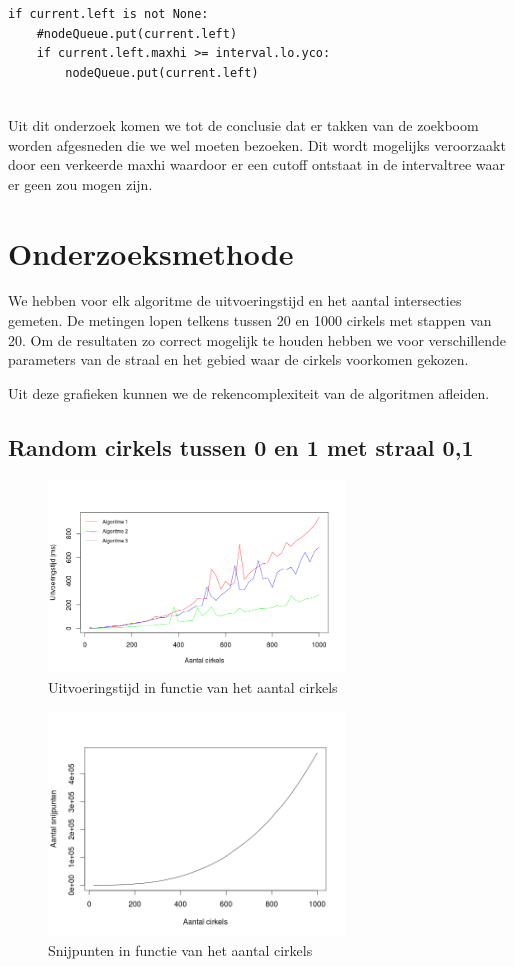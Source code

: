 \documentclass[11pt,a4paper]{article}
\begin{document}
\begin{verbatim}
if current.left is not None:
    #nodeQueue.put(current.left)
    if current.left.maxhi >= interval.lo.yco:
        nodeQueue.put(current.left)
                
\end{verbatim}
Uit dit onderzoek komen we tot de conclusie dat er takken van de zoekboom worden afgesneden die we wel moeten bezoeken. Dit wordt mogelijks veroorzaakt door een verkeerde maxhi waardoor er een cutoff ontstaat in de intervaltree waar er geen zou mogen zijn.

\section{Onderzoeksmethode}

We hebben voor elk algoritme de uitvoeringstijd en het aantal intersecties gemeten. De metingen lopen telkens tussen 20 en 1000 cirkels met stappen van 20. Om de resultaten zo correct mogelijk te houden hebben we voor verschillende parameters van de straal en het gebied waar de cirkels voorkomen gekozen.

Uit deze grafieken kunnen we de rekencomplexiteit van de algoritmen afleiden.

\subsection{Random cirkels tussen 0 en 1 met straal 0,1}
\begin{figure}[H]
\centering
\includegraphics[width=0.7\textwidth]{uitvoeringstijd_01.png}
\caption*{Uitvoeringstijd in functie van het aantal cirkels}
\end{figure}

\begin{figure}[H]
\centering
\includegraphics[width=0.7\textwidth]{snijpunten_01.png}
\caption*{Snijpunten in functie van het aantal cirkels}
\end{figure}
\end{document}
